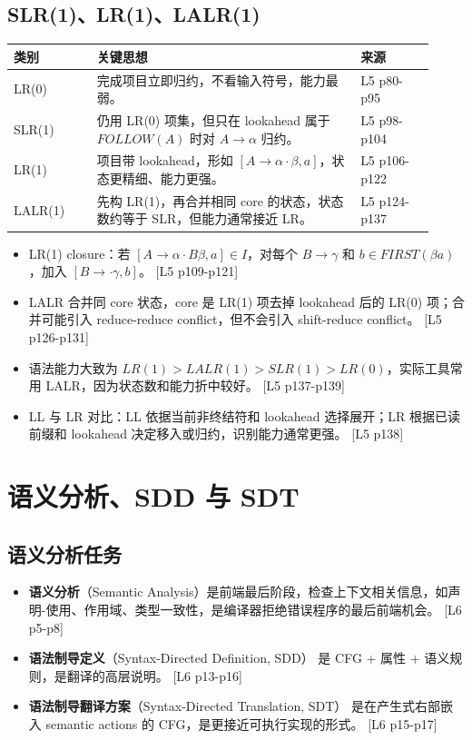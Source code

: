 \documentclass[UTF8,fontset=none,11pt]{ctexart}
\newcommand{\pg}[1]{{\scriptsize\textcolor{citegray}{[#1]}}}
\newcommand{\term}[2]{\textbf{#1}（#2）}
\begin{document}
\subsection{SLR(1)、LR(1)、LALR(1)}

\begin{longtable}{p{0.18\linewidth}p{0.58\linewidth}p{0.16\linewidth}}
\toprule
类别 & 关键思想 & 来源 \\
\midrule
LR(0) & 完成项目立即归约，不看输入符号，能力最弱。 & L5 p80-p95 \\
SLR(1) & 仍用 LR(0) 项集，但只在 lookahead 属于 \(FOLLOW(A)\) 时对 \(A\to\alpha\) 归约。 & L5 p98-p104 \\
LR(1) & 项目带 lookahead，形如 \([A\to\alpha\cdot\beta,a]\)，状态更精细、能力更强。 & L5 p106-p122 \\
LALR(1) & 先构 LR(1)，再合并相同 core 的状态，状态数约等于 SLR，但能力通常接近 LR。 & L5 p124-p137 \\
\bottomrule
\end{longtable}

\begin{itemize}
  \item LR(1) closure：若 \([A\to\alpha\cdot B\beta,a]\in I\)，对每个 \(B\to\gamma\) 和 \(b\in FIRST(\beta a)\)，加入 \([B\to\cdot\gamma,b]\)。 \pg{L5 p109-p121}
  \item LALR 合并同 core 状态，core 是 LR(1) 项去掉 lookahead 后的 LR(0) 项；合并可能引入 reduce-reduce conflict，但不会引入 shift-reduce conflict。 \pg{L5 p126-p131}
  \item 语法能力大致为 \(LR(1) > LALR(1) > SLR(1) > LR(0)\)，实际工具常用 LALR，因为状态数和能力折中较好。 \pg{L5 p137-p139}
  \item LL 与 LR 对比：LL 依据当前非终结符和 lookahead 选择展开；LR 根据已读前缀和 lookahead 决定移入或归约，识别能力通常更强。 \pg{L5 p138}
\end{itemize}

\section{语义分析、SDD 与 SDT}

\subsection{语义分析任务}

\begin{itemize}
  \item \term{语义分析}{Semantic Analysis}是前端最后阶段，检查上下文相关信息，如声明-使用、作用域、类型一致性，是编译器拒绝错误程序的最后前端机会。 \pg{L6 p5-p8}
  \item \term{语法制导定义}{Syntax-Directed Definition, SDD} 是 CFG + 属性 + 语义规则，是翻译的高层说明。 \pg{L6 p13-p16}
  \item \term{语法制导翻译方案}{Syntax-Directed Translation, SDT} 是在产生式右部嵌入 semantic actions 的 CFG，是更接近可执行实现的形式。 \pg{L6 p15-p17}
\end{itemize}
\end{document}
